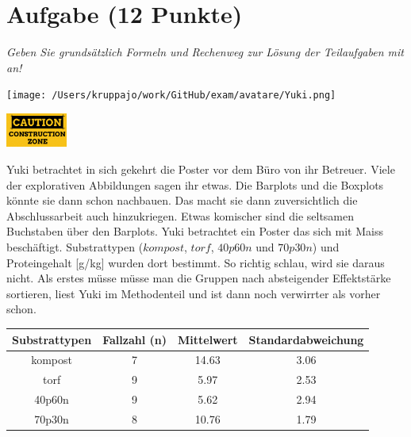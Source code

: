 \documentclass[a4paper, 9pt]{scrartcl}\usepackage[]{graphicx}\usepackage[]{xcolor}
\newenvironment{knitrout}{}{} %
\begin{document}
 
\clearpage

\section{Aufgabe \hfill (12 Punkte)}

\textit{Geben Sie grundsätzlich Formeln und Rechenweg zur Lösung der Teilaufgaben mit an!} \\[1Ex]
 

 
\begin{minipage}[t]{0.5\textwidth}
\texttt{[image: /Users/kruppajo/work/GitHub/exam/avatare/Yuki.png]}
\end{minipage}
\begin{minipage}[t]{0.5\textwidth}
\hfill
\href{https://youtu.be/RagTFFKFbFg}{\includegraphics[width = 2cm]{img/caution}}
\end{minipage}
\vspace{1ex}



Yuki betrachtet in sich gekehrt die Poster vor dem Büro von ihr Betreuer. Viele der explorativen Abbildungen sagen ihr etwas. Die Barplots und die Boxplots könnte sie dann schon nachbauen. Das macht sie dann zuversichtlich die Abschlussarbeit auch hinzukriegen. Etwas komischer sind die seltsamen Buchstaben über den Barplots. Yuki betrachtet ein Poster das sich mit Maiss beschäftigt. Substrattypen ($kompost$, $torf$, $40p60n$ und $70p30n$) und Proteingehalt [g/kg] wurden dort bestimmt. So richtig schlau, wird sie daraus nicht. Als erstes müsse müsse man die Gruppen nach absteigender Effektstärke sortieren, liest Yuki im Methodenteil und ist dann noch verwirrter als vorher schon.

\begin{knitrout}
\color{fgcolor}\begin{table}[!h]
\centering\begingroup\fontsize{10}{12}\selectfont

\begin{tabular}{cccc}
\toprule
\textbf{Substrattypen} & \textbf{Fallzahl (n)} & \textbf{Mittelwert} & \textbf{Standardabweichung}\\
\midrule
kompost & 7 & 14.63 & 3.06\\
torf & 9 & 5.97 & 2.53\\
40p60n & 9 & 5.62 & 2.94\\
70p30n & 8 & 10.76 & 1.79\\
\bottomrule
\end{tabular}
\endgroup{}
\end{table}

\end{knitrout}
\end{document}
